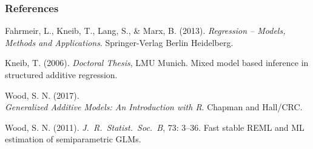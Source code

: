 \documentclass[final]{beamer}
\begin{document}
\appendix
\begin{frame}
\frametitle{References}
				\begin{thebibliography}{10}
				
Fahrmeir, L., Kneib, T., Lang, S., \&  Marx, B. (2013). {\em Regression -- Models, Methods and Applications}.
\newblock Springer-Verlag Berlin Heidelberg.

Kneib, T. (2006). {\em Doctoral Thesis}, LMU Munich.
\newblock Mixed model based inference in structured additive regression.

Wood, S. N. (2017). \\ {\em Generalized Additive Models: An Introduction with R}.
\newblock Chapman and Hall/CRC.

Wood, S. N. (2011). {\em J.\ R.\ Statist.\ Soc.\ B}, 73: 3--36.
\newblock Fast stable REML and ML estimation of semiparametric GLMs.

\end{thebibliography}
\end{frame}
\end{document}

